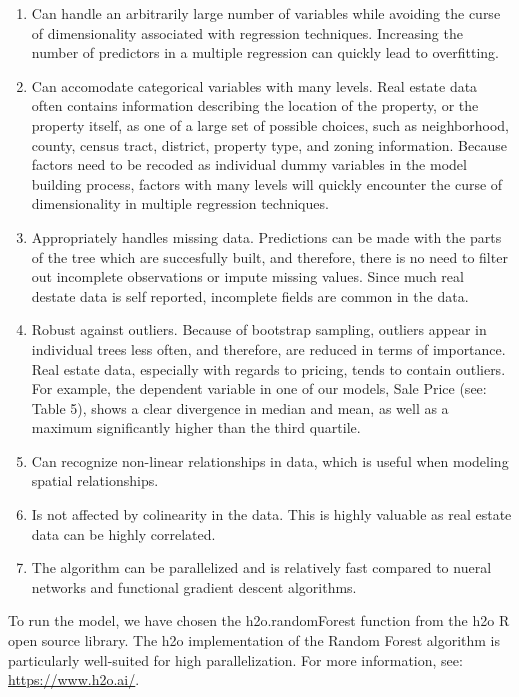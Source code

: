 \documentclass[]{article}
\providecommand{\tightlist}{%
  \setlength{\itemsep}{0pt}\setlength{\parskip}{0pt}}
\begin{document}
\begin{enumerate}
\def\labelenumi{\arabic{enumi}.}
\tightlist
\item
  Can handle an arbitrarily large number of variables while avoiding the
  curse of dimensionality associated with regression techniques.
  Increasing the number of predictors in a multiple regression can
  quickly lead to overfitting.
\item
  Can accomodate categorical variables with many levels. Real estate
  data often contains information describing the location of the
  property, or the property itself, as one of a large set of possible
  choices, such as neighborhood, county, census tract, district,
  property type, and zoning information. Because factors need to be
  recoded as individual dummy variables in the model building process,
  factors with many levels will quickly encounter the curse of
  dimensionality in multiple regression techniques.
\item
  Appropriately handles missing data. Predictions can be made with the
  parts of the tree which are succesfully built, and therefore, there is
  no need to filter out incomplete observations or impute missing
  values. Since much real destate data is self reported, incomplete
  fields are common in the data.
\item
  Robust against outliers. Because of bootstrap sampling, outliers
  appear in individual trees less often, and therefore, are reduced in
  terms of importance. Real estate data, especially with regards to
  pricing, tends to contain outliers. For example, the dependent
  variable in one of our models, Sale Price (see: Table 5), shows a
  clear divergence in median and mean, as well as a maximum
  significantly higher than the third quartile.
\item
  Can recognize non-linear relationships in data, which is useful when
  modeling spatial relationships.
\item
  Is not affected by colinearity in the data. This is highly valuable as
  real estate data can be highly correlated.
\item
  The algorithm can be parallelized and is relatively fast compared to
  nueral networks and functional gradient descent algorithms.
\end{enumerate}

To run the model, we have chosen the h2o.randomForest function from the
h2o R open source library. The h2o implementation of the Random Forest
algorithm is particularly well-suited for high parallelization. For more
information, see: \url{https://www.h2o.ai/}.
\end{document}
